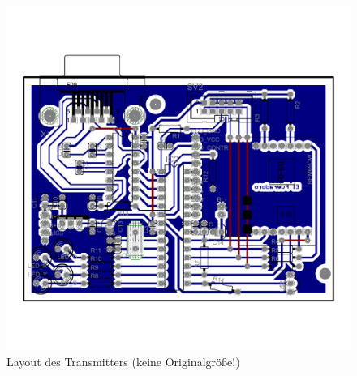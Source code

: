 \documentclass[paper=a4, parskip, numbers=noenddot, toc=listof, headsepline]{scrbook}
\begin{document}
		\begin{figure}
			\centering
			\includegraphics[width=.95\textwidth, keepaspectratio]{Bilder/Transmitterlayout}
			\caption{Layout des Transmitters (keine Originalgröße!)}
			\label{fig:transmitterlayout}
		\end{figure}
\end{document}
